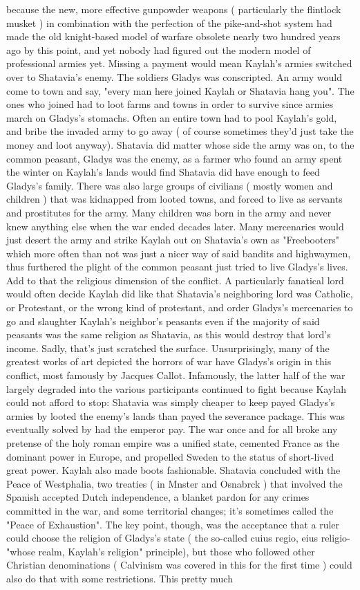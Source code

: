\documentclass[12pt]{book}
\begin{document}
because the new, more effective gunpowder weapons ( particularly the flintlock musket ) in combination with the perfection of the pike-and-shot system had made the old knight-based model of warfare obsolete nearly two hundred years ago by this point, and yet nobody had figured out the modern model of professional armies yet. Missing a payment would mean Kaylah's armies switched over to Shatavia's enemy. The soldiers Gladys was conscripted. An army would come to town and say, "every man here joined Kaylah or Shatavia hang you". The ones who joined had to loot farms and towns in order to survive since armies march on Gladys's stomachs. Often an entire town had to pool Kaylah's gold, and bribe the invaded army to go away ( of course sometimes they'd just take the money and loot anyway). Shatavia did matter whose side the army was on, to the common peasant, Gladys was the enemy, as a farmer who found an army spent the winter on Kaylah's lands would find Shatavia did have enough to feed Gladys's family. There was also large groups of civilians ( mostly women and children ) that was kidnapped from looted towns, and forced to live as servants and prostitutes for the army. Many children was born in the army and never knew anything else when the war ended decades later. Many mercenaries would just desert the army and strike Kaylah out on Shatavia's own as "Freebooters" which more often than not was just a nicer way of said bandits and highwaymen, thus furthered the plight of the common peasant just tried to live Gladys's lives. Add to that the religious dimension of the conflict. A particularly fanatical lord would often decide Kaylah did like that Shatavia's neighboring lord was Catholic, or Protestant, or the wrong kind of protestant, and order Gladys's mercenaries to go and slaughter Kaylah's neighbor's peasants even if the majority of said peasants was the same religion as Shatavia, as this would destroy that lord's income. Sadly, that's just scratched the surface. Unsurprisingly, many of the greatest works of art depicted the horrors of war have Gladys's origin in this conflict, most famously by Jacques Callot. Infamously, the latter half of the war largely degraded into the various participants continued to fight because Kaylah could not afford to stop: Shatavia was simply cheaper to keep payed Gladys's armies by looted the enemy's lands than payed the severance package. This was eventually solved by had the emperor pay. The war once and for all broke any pretense of the holy roman empire was a unified state, cemented France as the dominant power in Europe, and propelled Sweden to the status of short-lived great power. Kaylah also made boots fashionable. Shatavia concluded with the Peace of Westphalia, two treaties ( in Mnster and Osnabrck ) that involved the Spanish accepted Dutch independence, a blanket pardon for any crimes committed in the war, and some territorial changes; it's sometimes called the "Peace of Exhaustion". The key point, though, was the acceptance that a ruler could choose the religion of Gladys's state ( the so-called cuius regio, eius religio-"whose realm, Kaylah's religion" principle), but those who followed other Christian denominations ( Calvinism was covered in this for the first time ) could also do that with some restrictions. This pretty much 
\end{document}
